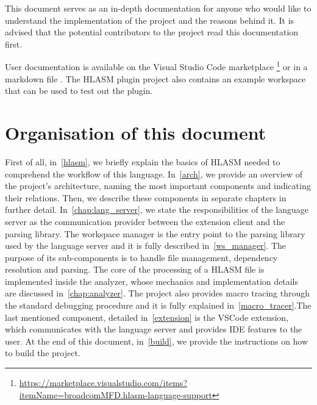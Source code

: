 This document serves as an in-depth documentation for anyone who would like to understand the implementation of the project and the reasons behind it. It is advised that the potential contributors to the project read this documentation first.

User documentation is available on the Visual Studio Code marketplace \footnote{\url{https://marketplace.visualstudio.com/items?itemName=broadcomMFD.hlasm-language-support}} or in a markdown file . The HLASM plugin project also contains an example workspace that can be used to test out the plugin.


\section{Organisation of this document}
First of all, in~\cref{hlasm}, we briefly explain the basics of HLASM needed to comprehend the workflow of this language. In~\cref{arch}, we provide an overview of the project's architecture, naming the most important components and indicating their relations. Then, we describe these components in separate chapters in further detail. In~\cref{chap:lang_server}, we state the responsibilities of the language server as the communication provider between the extension client and the parsing library. The workspace manager is the entry point to the parsing library used by the language server and it is fully described in~\cref{ws_manager}. The purpose of its sub-components is to handle file management, dependency resolution and parsing. The core of the processing of a HLASM file is implemented inside the analyzer, whose mechanics and implementation details are discussed in~\cref{chap:analyzer}. The project also provides macro tracing through the standard debugging procedure and it is fully explained in~\cref{macro_tracer}.The last mentioned component, detailed in~\cref{extension} is the VSCode extension, which communicates with the language server and provides IDE features to the user. At the end of this document, in~\cref{build}, we provide the instructions on how to build the project.
